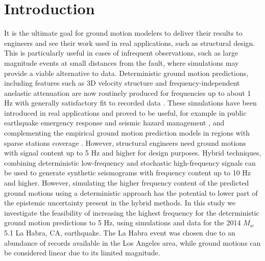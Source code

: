 \section{Introduction} \label{highf:intro}
It is the ultimate goal for ground motion modelers to deliver their results to engineers and see their work used in real applications, such as structural design. This is particularly useful in cases of infrequent observations, such as large magnitude events at small distances from the fault, where simulations may provide a viable alternative to data. Deterministic ground motion predictions, including features such as 3D velocity structure and frequency-independent anelastic attenuation are now routinely produced for frequencies up to about 1 Hz with generally satisfactory fit to recorded data . These simulations have been introduced in real applications and proved to be useful, for example in public earthquake emergency response and seismic hazard management \citep{gravesBroadbandGroundMotionSimulation2010}, and complementing the empirical ground motion prediction models in regions with sparse stations coverage \citep{dayModelBasinEffects2008}.  However, structural engineers need ground motions with signal content up to 5 Hz and higher for design purposes. Hybrid techniques, combining deterministic low-frequency and stochastic high-frequency signals  can be used to generate synthetic seismograms with frequency content up to 10 Hz and higher. However, simulating the higher frequency content of the predicted ground motions using a deterministic approach has the potential to lower part of the epistemic uncertainty present in the hybrid methods. In this study we investigate the feasibility of increasing the highest frequency for the deterministic ground motion predictions to 5 Hz, using simulations and data for the 2014 $M_w$ 5.1 La Habra, CA, earthquake. The La Habra event was chosen due to an abundance of records available in the Los Angeles area, while ground motions can be considered linear due to its limited magnitude.


